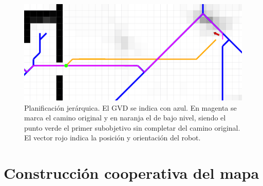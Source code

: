 \begin{figure}[H]
  \center
  \includegraphics[width=1\linewidth]{imagenes/navjer/caso1/a.png}
  \caption[Planificación jerárquica.]{Planificación jerárquica. El GVD
    se indica con azul. En magenta se marca el camino original y en
    naranja el de bajo nivel, siendo el punto verde el primer
    subobjetivo sin completar del camino original. El vector rojo indica
    la posición y orientación del robot.
 }
  \label{fig:navjer}
\end{figure} 


\section{Construcción cooperativa del mapa}




